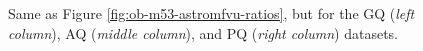 \documentclass[]{spie}  %
\begin{document}
\begin{figure}[!h]
  \hspace{-1.5cm}
  \caption{\footnotesize Same as Figure \ref{fig:ob-m53-astromfvu-ratios}, but for the GQ (\textit{left column}), AQ (\textit{middle column}), and PQ (\textit{right column}) datasets.} \label{fig:gc-astrom}
\end{figure}
\end{document}
